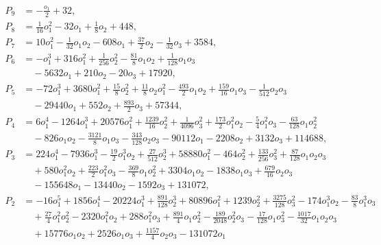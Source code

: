 \documentclass[a4paper,reqno]{amsart}
\numberwithin{equation}{section}
\numberwithin{equation}{section}
\begin{document}
\begin{align*}
    P_{9} &= -\frac{o_1}{2}+ 32, \\
    P_{8} &= \frac{1}{16}o_1^2-32 o_1+\frac{1}{8}o_2+448, \\
    P_{7} &= 10 o_1^2-\frac{1}{32}o_1 o_2 -608 o_1+\frac{37 }{2}o_2-\frac{1}{32}o_3+3584, \\
    P_{6} &= 
    -o_1^3
    +316 o_1^2
    +\frac{1}{256}o_2^2
    -\frac{81}{8}o_1o_2 
    +\frac{1 }{128}o_1o_3
    \\
    &\quad -5632 o_1
    +210 o_2
    -20 o_3
    +17920, \\
    P_{5} &= 
    -72 o_1^3
    +3680 o_1^2
    +\frac{15 }{8}o_2^2
    +\frac{11}{8} o_2 o_1^2
    -\frac{493 }{2}o_1 o_2 
    +\frac{159 }{16}o_1 o_3 
    -\frac{1}{512}o_2 o_3
    \\
    &\quad 
    -29440 o_1
    +552 o_2
    +\frac{893 }{2}o_3
    +57344, \\
    P_{4} &= 
    6 o_1^4
    -1264 o_1^3
    +20576 o_1^2
    +\frac{1239 }{16}o_2^2
    +\frac{1}{4096}o_3^2
    +\frac{173}{2}  o_1^2o_2
    -\frac{5}{4}  o_1^2 o_3
    -\frac{63}{128}o_1 o_2^2  
    \\
    &\quad 
    -826 o_1 o_2 
    -\frac{3121 }{8}o_1 o_3 
    -\frac{343 }{128}o_2 o_3
    -90112 o_1
    -2208 o_2
    +3132 o_3
    +114688, \\
    P_{3} &= 
    224 o_1^4
    -7936 o_1^3
    -\frac{19}{2} o_1^3 o_2 
     +\frac{27 }{512}o_2^3
   +58880 o_1^2
     -464 o_2^2
   +\frac{133 }{256}o_3^2
     +\frac{87}{128} o_1 o_2 o_3 
   \\
    &\quad 
   +580 o_1^2 o_2 
    +\frac{223}{2} o_1^2 o_3 
    -\frac{369}{8} o_1 o_2^2 
    +3304 o_1 o_2 
    -1838 o_1 o_3 
    +\frac{679 }{16}o_2 o_3
    \\
    &\quad 
    -155648 o_1
    -13440 o_2
    -1592 o_3
    +131072, \\
    P_{2} &= 
    -16 o_1^5
    +1856 o_1^4
    -20224 o_1^3
    +\frac{891 }{128}o_2^3
    +80896 o_1^2
    +1239 o_2^2
    +\frac{3275 }{128} o_3^2
    -174 o_1^3 o_2 
    -\frac{83}{8} o_1^3 o_3 \\
    &\quad 
    +\frac{27}{4} o_1^2 o_2^2 
    -2320 o_1^2 o_2 
    +288 o_1^2 o_3 
    +\frac{891}{4}  o_1 o_2^2
    -\frac{189 }{2048}o_2^2 o_3
    -\frac{17}{128}  o_1 o_3^2
    -\frac{1017}{32} o_1 o_2 o_3 \\
    &\quad 
    +15776  o_1 o_2
    +2526 o_1 o_3 
    +\frac{1157 }{4}o_2 o_3
    -131072 o_1

\end{align*}
\end{document}
